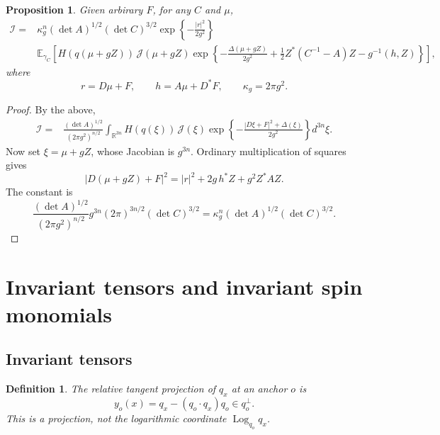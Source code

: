 \documentclass[11pt]{article}
\newcommand{\R}{\mathbb R}
\newcommand{\E}{\mathbb E}
\newcommand{\Log}{\operatorname{Log}}
\numberwithin{equation}{section}
\newtheorem{proposition}[theorem]{Proposition}
\newtheorem{definition}[theorem]{Definition}
\theoremstyle{definition}
\theoremstyle{plain}
\begin{document}
\begin{proposition} \label{prop:background-expect}
Given arbirary $F$, for any $C$ and $\mu$,
\begin{equation}
\begin{aligned}
 \mathcal I={}&
 \kappa_g^n(\det A)^{1/2}(\det C)^{3/2}
 \exp\!\left\{-\frac{|r|^2}{2g^2}\right\}
 \\
 &\E_{\gamma_C}\left[
 H(q(\mu+gZ))\,\mathcal J(\mu+gZ)
 \exp\!\left\{
 -\frac{\Delta(\mu+gZ)}{2g^2}
 +\frac12 Z^*(C^{-1}-A)Z
 -g^{-1}(h,Z)
 \right\}\right],
 \label{eq:main}
\end{aligned}
\end{equation}
where %
\begin{equation}
 r=D\mu+F,\qquad h=A\mu+D^*F,
 \qquad \kappa_g=2\pi g^2.
\end{equation}
\end{proposition}

\begin{proof}
By the above,
\begin{align}
 \mathcal I={}&
 \frac{(\det A)^{1/2}}{(2\pi g^2)^{n/2}}
 \int_{\R^{3n}}H(q(\xi))\,\mathcal J(\xi)
 \exp\!\left\{-\frac{|D\xi+F|^2+\Delta(\xi)}{2g^2}\right\}d^{3n}\xi.
 \label{eq:lebesgue}
\end{align}
Now set $\xi=\mu+gZ$, whose Jacobian is $g^{3n}$.
Ordinary multiplication of squares gives
\begin{equation}
 |D(\mu+gZ)+F|^2
 =|r|^2+2g\,h^*Z+g^2Z^*AZ.
\end{equation}
The constant is
\begin{equation}
 \frac{(\det A)^{1/2}}{(2\pi g^2)^{n/2}}
 g^{3n}(2\pi)^{3n/2}(\det C)^{3/2}
 =\kappa_g^n(\det A)^{1/2}(\det C)^{3/2}.
\end{equation}
\end{proof}

\newpage
\section{Invariant tensors and invariant spin monomials}
\label{sec:invariant-tensors}

\subsection{Invariant tensors}

\begin{definition}
The relative tangent projection of $q_x$ at an anchor $o$ is
\begin{equation}
 y_o(x)=q_x-(q_o\cdot q_x)q_o\in q_o^\perp.
 \label{eq:canonical-tangent}
\end{equation}
This is a projection, not the logarithmic coordinate $\Log_{q_o}q_x$.
\end{definition}
\end{document}
